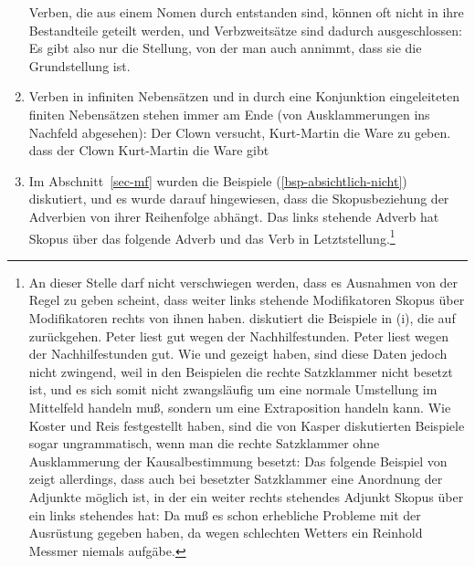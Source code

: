 \begin{enumerate}
Verben, die aus einem Nomen durch  entstanden sind, können oft nicht
in ihre Bestandteile geteilt werden, und Verbzweitsätze sind dadurch ausgeschlossen:
\eal
{}
\zl
Es gibt also nur die Stellung, von der man auch annimmt, dass sie die Grundstellung ist.
\item Verben in infiniten Nebensätzen und in durch eine Konjunktion eingeleiteten
finiten Nebensätzen stehen immer am Ende (von Ausklammerungen ins Nachfeld abgesehen):
\eal
\ex Der Clown versucht, Kurt-Martin die Ware zu geben.
\ex dass der Clown Kurt-Martin die Ware gibt
\zl
\item{} Im Abschnitt~\ref{sec-mf} wurden die Beispiele (\ref{bsp-absichtlich-nicht}) diskutiert,
und es wurde darauf hingewiesen, dass die Skopusbeziehung der Adverbien
von ihrer Reihenfolge abhängt. Das links stehende Adverb hat Skopus über das folgende Adverb
und das Verb in Letztstellung.\footnote{%
An dieser Stelle darf nicht verschwiegen werden,
  dass es Ausnahmen von der Regel zu geben scheint, dass weiter links stehende Modifikatoren
  Skopus über Modifikatoren rechts von ihnen haben. \citet*[]{Kasper94a}
  diskutiert die Beispiele in (i), die auf  \citet*[]{BV72} zurückgehen.
\eal
\label{bsp-peter-liest-gut-wegen}
\ex Peter liest gut wegen der Nachhilfestunden.
\ex Peter liest wegen der Nachhilfestunden gut.
\zl
  Wie \citet[Abschnitt~6]{Koster75a} und \citet*[]{Reis80a} gezeigt haben, sind diese Daten jedoch nicht
  zwingend, weil in den Beispielen die rechte Satzklammer nicht besetzt ist, und es sich
  somit nicht zwangsläufig um eine normale Umstellung im Mittelfeld handeln muß, sondern um 
  eine Extraposition handeln kann. Wie Koster und Reis festgestellt haben,
  sind die von Kasper diskutierten Beispiele sogar ungrammatisch,
  wenn man die rechte Satzklammer ohne Ausklammerung der Kausalbestimmung besetzt:
\eal
{}
\zl
  Das folgende Beispiel von \citet[]{Crysmann2004a}
  zeigt allerdings, dass auch bei besetzter Satzklammer eine Anordnung der Adjunkte
  möglich ist, in der ein weiter rechts stehendes Adjunkt Skopus über ein links stehendes hat:
\ea
Da muß es schon erhebliche Probleme mit der Ausrüstung gegeben haben, da wegen schlechten
  Wetters ein Reinhold Messmer niemals aufgäbe.
}
\end{enumerate}
